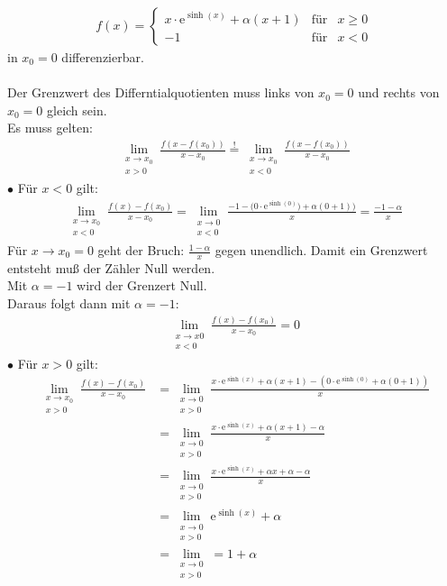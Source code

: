 \begin{align*}
f(x) =     \left\{ \begin{array}{rcl}
x\cdot\mathrm{e}^{\sinh(x)} +\alpha(x+1)& \mbox{für} & x\geq0\\
-1&\mbox{für} & x<0
\end{array}\right.
\end{align*}
in $ x_0=0 $ differenzierbar.\\
\\
Der Grenzwert des Differntialquotienten muss links von $ x_0=0 $ und rechts von $ x_0=0 $ gleich sein.\\
Es muss gelten:\\
\begin{align*}
\lim\limits_ {\substack{x\to x_0\\x>0}}\frac{f(x-f(x_0))}{x-x_0}\overset{!}{=}\lim\limits_ {\substack{x\to x_0\\x<0}}\frac{f(x-f(x_0))}{x-x_0}
\end{align*}
$\bullet$ \;\;Für $ x<0 $ gilt:\\
\begin{align*}
\lim\limits_ {\substack{x\to x_0\\x<0}}\frac{f(x)-f(x_0)}{x-x_0}=\lim\limits_ {\substack{x\to 0\\x<0}}\frac{-1-\big(0\cdot \mathrm{e}^{\sinh(0)})+\alpha(0+1)\big)}{x}=\frac{-1-\alpha}{x}
\end{align*}
Für $ x\to x_0=0 $ geht der Bruch: $ \frac{1-\alpha}{x} $ gegen unendlich. Damit ein Grenzwert entsteht muß der Zähler Null werden.\\ Mit $ \alpha=-1 $ wird der Grenzert Null.\\
Daraus folgt dann mit $ \alpha=-1 $:\\
\begin{align*}
\lim\limits_ {\substack{x\to x0\\x<0}}\frac{f(x)-f(x_0)}{x-x_0}=0
\end{align*}
$\bullet$ \;\;Für $ x>0 $ gilt:\\
\begin{align*}
\lim\limits_ {\substack{x\to x_0\\x>0}}\frac{f(x)-f(x_0)}{x-x_0}&=\lim\limits_ {\substack{x\to 0\\x>0}}\frac{x\cdot\mathrm{e}^{\sinh(x)}+\alpha(x+1)-(0\cdot\mathrm{e}^{\sinh(0)}+\alpha(0+1))}{x}\\
&=\lim\limits_ {\substack{x\to 0\\x>0}}\frac{x\cdot\mathrm{e}^{\sinh(x)}+\alpha(x+1)-\alpha}{x}\\
&=\lim\limits_ {\substack{x\to 0\\x>0}}\frac{x\cdot\mathrm{e}^{\sinh(x)}+\alpha x+\alpha-\alpha}{x}\\
&=\lim\limits_ {\substack{x\to 0\\x>0}}\mathrm{e}^{\sinh(x)}+\alpha\\
&=\lim\limits_ {\substack{x\to 0\\x>0}}=1+\alpha
\end{align*}
